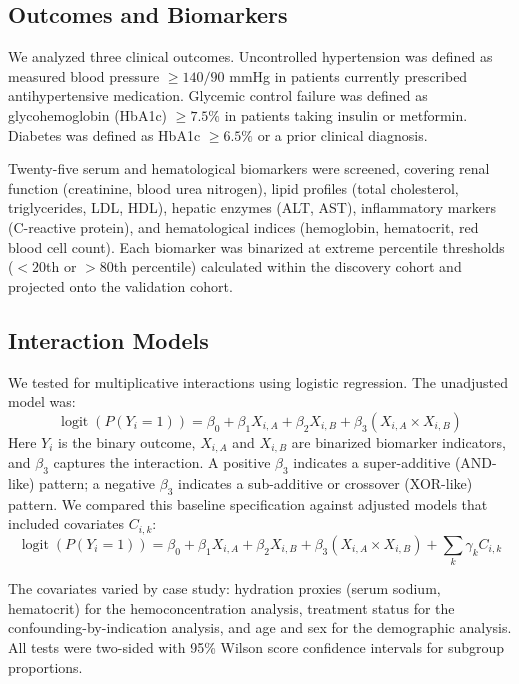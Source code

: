\documentclass[10pt,letterpaper]{article}
\begin{document}
\subsection{Outcomes and Biomarkers}
We analyzed three clinical outcomes. Uncontrolled hypertension was defined as measured blood pressure $\ge 140/90$ mmHg in patients currently prescribed antihypertensive medication. Glycemic control failure was defined as glycohemoglobin (HbA1c) $\ge 7.5\%$ in patients taking insulin or metformin. Diabetes was defined as HbA1c $\ge 6.5\%$ or a prior clinical diagnosis.

Twenty-five serum and hematological biomarkers were screened, covering renal function (creatinine, blood urea nitrogen), lipid profiles (total cholesterol, triglycerides, LDL, HDL), hepatic enzymes (ALT, AST), inflammatory markers (C-reactive protein), and hematological indices (hemoglobin, hematocrit, red blood cell count). Each biomarker was binarized at extreme percentile thresholds ($<20$th or $>80$th percentile) calculated within the discovery cohort and projected onto the validation cohort.

\subsection{Interaction Models}
We tested for multiplicative interactions using logistic regression. The unadjusted model was:
\begin{equation}
\operatorname{logit}(P(Y_i = 1)) = \beta_0 + \beta_1 X_{i,A} + \beta_2 X_{i,B} + \beta_3 (X_{i,A} \times X_{i,B})
\end{equation}
Here $Y_i$ is the binary outcome, $X_{i,A}$ and $X_{i,B}$ are binarized biomarker indicators, and $\beta_3$ captures the interaction. A positive $\beta_3$ indicates a super-additive (AND-like) pattern; a negative $\beta_3$ indicates a sub-additive or crossover (XOR-like) pattern. We compared this baseline specification against adjusted models that included covariates $C_{i,k}$:
\begin{equation}
\operatorname{logit}(P(Y_i = 1)) = \beta_0 + \beta_1 X_{i,A} + \beta_2 X_{i,B} + \beta_3 (X_{i,A} \times X_{i,B}) + \sum_{k} \gamma_k C_{i,k}
\end{equation}

The covariates varied by case study: hydration proxies (serum sodium, hematocrit) for the hemoconcentration analysis, treatment status for the confounding-by-indication analysis, and age and sex for the demographic analysis. All tests were two-sided with 95\% Wilson score confidence intervals for subgroup proportions.
\end{document}
